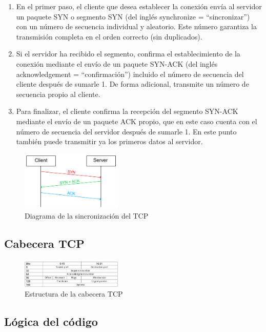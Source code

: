 \documentclass[letterpaper, 10 pt, conference]{ieeeconf}  %
\begin{document}
\begin{enumerate}
	\item En el primer paso, el cliente que desea establecer la conexión envía al servidor un paquete SYN o segmento SYN (del inglés synchronize = “sincronizar”) con un número de secuencia individual y aleatorio. Este número garantiza la transmisión completa en el orden correcto (sin duplicados).
	\item Si el servidor ha recibido el segmento, confirma el establecimiento de la conexión mediante el envío de un paquete SYN-ACK (del inglés acknowledgement = “confirmación”) incluido el número de secuencia del cliente después de sumarle 1. De forma adicional, transmite un número de secuencia propio al cliente.
	\item Para finalizar, el cliente confirma la recepción del segmento SYN-ACK mediante el envío de un paquete ACK propio, que en este caso cuenta con el número de secuencia del servidor después de sumarle 1. En este punto también puede transmitir ya los primeros datos al servidor.
\end{enumerate}

\begin{figure}[H]
	\centering
	\includegraphics[width=0.43\textwidth]{./Imagenes/tcp_ack.png}
	\caption{Diagrama de la sincronización del TCP}
	\label{fig:tcp_ack}
\end{figure}

\subsection{Cabecera TCP}

\begin{figure}[H]
	\centering
	\includegraphics[width=0.43\textwidth]{./Imagenes/TPC_header.png}
	\caption{Estructura de la cabecera TCP}
	\label{fig:tcp_header}
\end{figure}

\subsection{Lógica del código}
\end{document}
